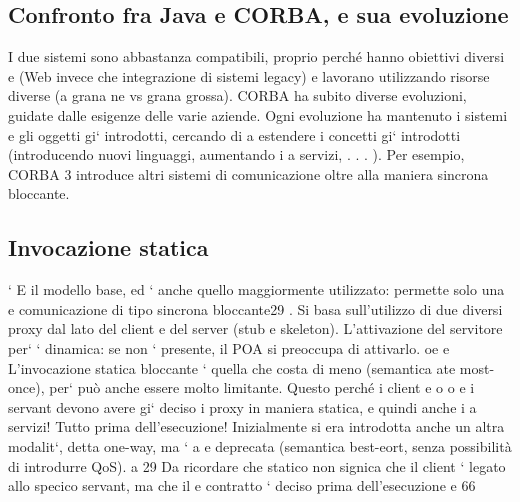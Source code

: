 \documentclass[a4paper,12pt]{article}
\begin{document}
\subsection{Confronto fra Java e CORBA, e sua evoluzione}
I due sistemi sono abbastanza compatibili, proprio perché hanno obiettivi diversi
e
(Web invece che integrazione di sistemi legacy) e lavorano utilizzando risorse
diverse (a grana ne vs grana grossa).
CORBA ha subito diverse evoluzioni, guidate dalle esigenze delle varie aziende.
Ogni evoluzione ha mantenuto i sistemi e gli oggetti gi` introdotti, cercando di
a
estendere i concetti gi` introdotti (introducendo nuovi linguaggi, aumentando i
a
servizi, . . . ). Per esempio, CORBA 3 introduce altri sistemi di comunicazione
oltre alla maniera sincrona bloccante.
\subsection{Invocazione statica}
`
E il modello base, ed ` anche quello maggiormente utilizzato: permette solo una
e
comunicazione di tipo sincrona bloccante29 . Si basa sull'utilizzo di due diversi
proxy dal lato del client e del server (stub e skeleton). L'attivazione del servitore
per` ` dinamica: se non ` presente, il POA si preoccupa di attivarlo.
oe
e
L'invocazione statica bloccante ` quella che costa di meno (semantica ate
most-once), per` può anche essere molto limitante. Questo perché i client e
o
o
e
i servant devono avere gi` deciso i proxy in maniera statica, e quindi anche i
a
servizi! Tutto prima dell'esecuzione!
Inizialmente si era introdotta anche un altra modalit`, detta one-way, ma `
a
e
deprecata (semantica best-eort, senza possibilità di introdurre QoS).
a
29 Da ricordare che statico non signica che il client ` legato allo specico servant, ma che il
e
contratto ` deciso prima dell'esecuzione
e
66
\end{document}
